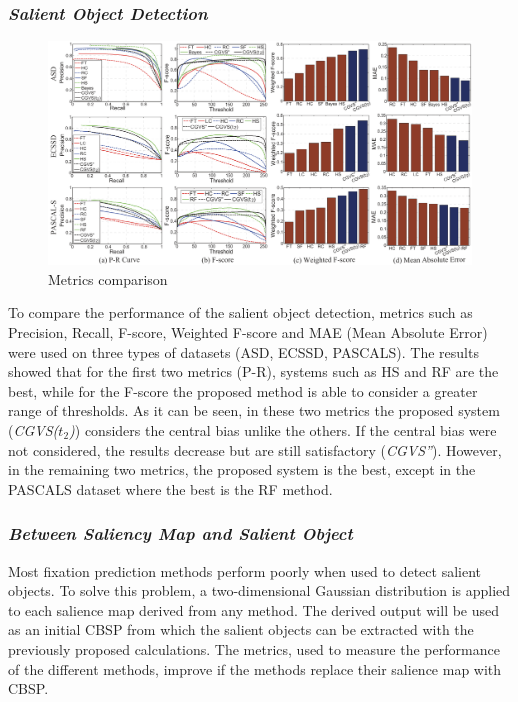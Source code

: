\subsubsection{\emph{Salient Object Detection}}
\begin{figure}[htbp]
    \centering
    \includegraphics[width = 1 \linewidth]{images/paper1/metrics.png}
    \centering
    \caption{Metrics comparison}
    \label{fig: metrics}
\end{figure}
To compare the performance of the salient object detection, metrics such 
as Precision, Recall, F-score, Weighted F-score and MAE (Mean Absolute 
Error) were used on three types of datasets (ASD, ECSSD, PASCALS). The 
results showed that for the first two metrics (P-R), systems such as HS and 
RF are the best, while for the F-score the proposed method is able to consider 
a greater range of thresholds. As it can be seen, in these two metrics the 
proposed system (\emph{CGVS($ t_2 $)}) considers the central bias unlike the others. 
If the central bias were not considered, the results decrease but are still 
satisfactory (\emph{CGVS''}). However, in the remaining two metrics, the proposed 
system is the best, except in the PASCALS dataset where the best is the RF 
method.

\subsubsection{\emph{Between Saliency Map and Salient Object}}
Most fixation prediction methods perform poorly when used to detect salient 
objects. To solve this problem, a two-dimensional Gaussian distribution is 
applied to each salience map derived from any method. The derived output 
will be used as an initial CBSP from which the salient objects can be 
extracted with the previously proposed calculations. The metrics, used to 
measure the performance of the different methods, improve if the methods 
replace their salience map with CBSP.
